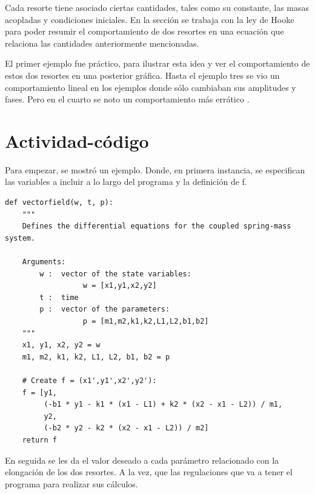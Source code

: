 \documentclass{article}
\begin{document}
Cada resorte tiene asociado ciertas cantidades, tales como su constante, las masas acopladas y condiciones iniciales. En la sección se trabaja con la ley de Hooke para poder resumir el comportamiento de dos resortes en una ecuación que relaciona las cantidades anteriormente mencionadas.

El primer ejemplo fue práctico, para ilustrar esta idea y ver el comportamiento de estos dos resortes en una posterior gráfica. Hasta el ejemplo tres se vio un comportamiento lineal en los ejemplos donde sólo cambiaban sus amplitudes y fases. Pero en el cuarto se noto un comportamiento más errático .



\section{Actividad-código}

Para empezar, se mostró un ejemplo. Donde, en primera instancia, se especifican las variables a incluir a lo largo del programa y la definición de f. 

\begin{verbatim}
def vectorfield(w, t, p):
    """
    Defines the differential equations for the coupled spring-mass system.

    Arguments:
        w :  vector of the state variables:
                  w = [x1,y1,x2,y2]
        t :  time
        p :  vector of the parameters:
                  p = [m1,m2,k1,k2,L1,L2,b1,b2]
    """
    x1, y1, x2, y2 = w
    m1, m2, k1, k2, L1, L2, b1, b2 = p

    # Create f = (x1',y1',x2',y2'):
    f = [y1,
         (-b1 * y1 - k1 * (x1 - L1) + k2 * (x2 - x1 - L2)) / m1,
         y2,
         (-b2 * y2 - k2 * (x2 - x1 - L2)) / m2]
    return f
\end{verbatim}

En seguida se les da el valor deseado a cada parámetro relacionado con la elongación de los dos resortes. A la vez, que las regulaciones que va a tener el programa para realizar sus cálculos.
\end{document}
